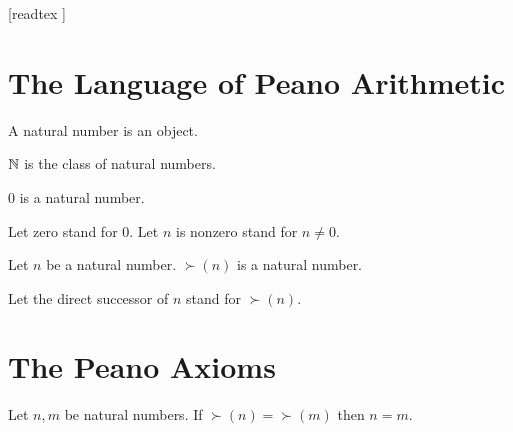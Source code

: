 \documentclass[10pt]{article}
\begin{document}
  \begin{imports}
    \begin{forthel}
      [readtex ]
    \end{forthel}
  \end{imports}


  \section{The Language of Peano Arithmetic}

  \begin{forthel}
    \begin{signature}
      A natural number is an object.
    \end{signature}
  \end{forthel}

  \begin{forthel}
    \begin{definition}
      $\mathbb{N}$ is the class of natural numbers.
    \end{definition}
  \end{forthel}

  \begin{forthel}
    \begin{signature}
      $0$ is a natural number.
    \end{signature}

    Let zero stand for $0$.
    Let $n$ is nonzero stand for $n \neq 0$.
  \end{forthel}

  \begin{forthel}
    \begin{signature}
      Let $n$ be a natural number.
      $\succ(n)$ is a natural number.
    \end{signature}

    Let the direct successor of $n$ stand for $\succ(n)$.
  \end{forthel}


  \section{The Peano Axioms}

  \begin{forthel}
    \begin{axiom}
      Let $n, m$ be natural numbers.
      If $\succ(n) = \succ(m)$ then $n = m$.
    \end{axiom}
  \end{forthel}
\end{document}
